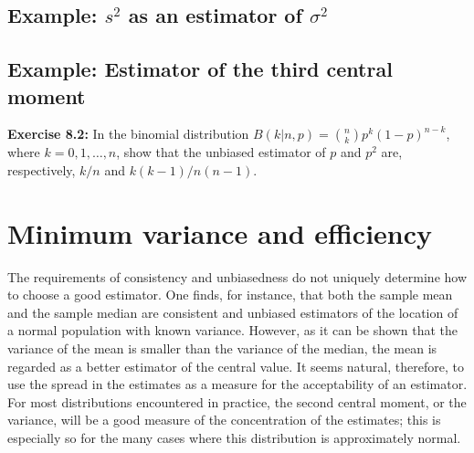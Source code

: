 \documentclass[../main.tex]{subfiles}
\begin{document}
\subsection{Example: $s^2$ as an estimator of $\sigma^2$}
\subsection{Example: Estimator of the third central moment}

\textbf{Exercise 8.2:}
In the binomial distribution $B(k | n,p) = \binom{n}{k} p^k (1-p)^{n-k}$,
where $k=0, 1, \ldots, n$,
show that the unbiased estimator of $p$ and $p^2$ are, respectively,
$k/n$ and $k(k-1)/n(n-1)$.

\section{Minimum variance and efficiency}

The requirements of consistency and unbiasedness do not uniquely determine how to choose a good estimator.
One finds, for instance, that both the sample mean and the sample median
are consistent and unbiased estimators of the location of a normal population with known variance.
However, as it can be shown that the variance of the mean is smaller than the variance of the median,
the mean is regarded as a better estimator of the central value.
It seems natural, therefore, to use the spread in the estimates as a measure for the acceptability of an estimator.
For most distributions encountered in practice,
the second central moment, or the variance, will be a good measure of the concentration of the estimates;
this is especially so for the many cases where this distribution is approximately normal.
\end{document}
